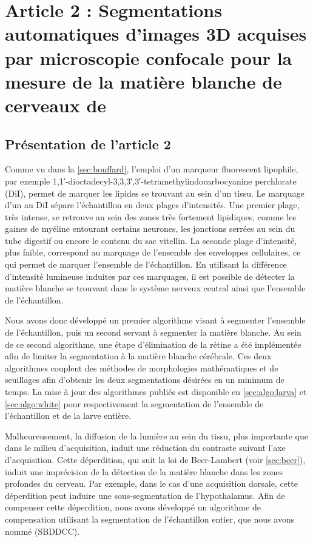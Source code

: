 \documentclass[\main/main.tex]{subfiles}
\begin{document}
\chapter{\label{sec:lempereur_info}
Article 2 : Segmentations automatiques d'images 3D acquises par microscopie confocale pour la mesure de la matière blanche de cerveaux de \pz{}
}

\section{Présentation de l'article 2}
%
Comme vu dans la \autoref{sec:bouffard}, l'emploi d'un marqueur fluorescent lipophile, par exemple 1,1′-dioctadecyl-3,3,3′,3′-tetramethylindocarbocyanine perchlorate (DiI), permet de marquer les lipides se trouvant au sein d'un tissu.
%
Le marquage d'un \pz{} au DiI sépare l'échantillon en deux plages d'intensités.
%
Une premier plage, très intense,
se retrouve au sein des zones très fortement lipidiques,
comme les gaines de myéline entourant certains neurones,
les jonctions serrées au sein du tube digestif ou encore le contenu du sac vitellin.
%
La seconde plage d'intensité, plus faible, correspond au marquage de l'ensemble des
enveloppes cellulaires, ce qui permet de marquer l'ensemble de l'échantillon.
%
En utilisant la différence d'intensité lumineuse induites par ces marquages,
il est possible de détecter la matière blanche se trouvant
dans le système nerveux central ainsi que l'ensemble de l'échantillon.

%
Nous avons donc développé un premier algorithme visant à segmenter l'ensemble de l'échantillon,
puis un second servant à segmenter la matière blanche.
%
Au sein de ce second algorithme, une étape d'élimination de la rétine a été implémentée
afin de limiter la segmentation à la matière blanche cérébrale.
%
Ces deux algorithmes couplent des méthodes de morphologies mathématiques et de seuillages
afin d'obtenir les deux segmentations désirées en un minimum de temps.
%
La mise à jour des algorithmes publiés est disponible en \autoref{sec:algo:larva} et \autoref{sec:algo:white}
pour respectivement la segmentation de l'ensemble de l'échantillon et de la larve entière.

%
Malheureusement, la diffusion de la lumière au sein du tissu, plus importante que dans le milieu d'acquisition, induit une réduction du contraste suivant l'axe d'acquisition.
%
Cette déperdition, qui suit la loi de Beer-Lambert (voir \autoref{sec:beer}), induit une imprécision de la détection de la matière blanche dans les zones profondes du cerveau.
%
Par exemple, dans le cas d'une acquisition dorsale,
cette déperdition peut induire une sous-segmentation de l'hypothalamus.
%
Afin de compenser cette déperdition, nous avons développé un algorithme de compensation
utilisant la segmentation de l'échantillon entier,  que nous avons nommé \sbddcc{} (SBDDCC).
\end{document}
